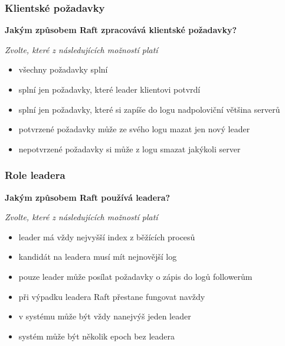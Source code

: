\documentclass[usenames,dvipsnames,9pt]{beamer}
\begin{document}
{
\begin{frame}[fragile]
\frametitle{Klientské požadavky}

\begin{center}
{\bf Jakým způsobem Raft zpracovává klientské požadavky?}
\end{center}

\vspace{2em}

{\em Zvolte, které z následujících možností platí}

\begin{itemize}
\item všechny požadavky splní
\item splní jen požadavky, které leader klientovi potvrdí
\item splní jen požadavky, které si zapíše do logu nadpoloviční většina serverů
\item potvrzené požadavky může ze svého logu mazat jen nový leader
\item nepotvrzené požadavky si může z logu smazat jakýkoli server
\end{itemize}

\end{frame}


\begin{frame}[fragile]
\frametitle{Role leadera}

\begin{center}
{\bf Jakým způsobem Raft používá leadera?}
\end{center}

\vspace{2em}

{\em Zvolte, které z následujících možností platí}

\begin{itemize}
\item leader má vždy nejvyšší index z běžících procesů
\item kandidát na leadera musí mít nejnovější log
\item pouze leader může posílat požadavky o zápis do logů followerům
\item při výpadku leadera Raft přestane fungovat navždy
\item v systému může být vždy nanejvýš jeden leader
\item systém může být několik epoch bez leadera
\end{itemize}

\end{frame}
}
\end{document}
